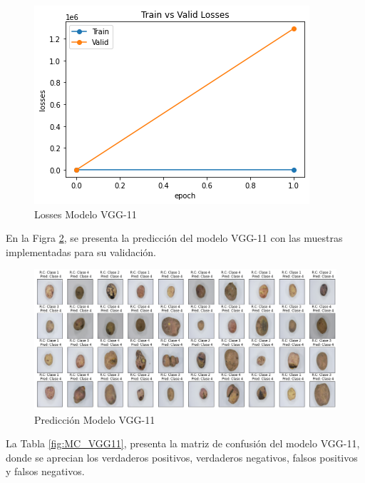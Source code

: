 \begin{figure}[ht]
	\centering
	\includegraphics[scale=0.5]{Figs/106.png}
	\caption{Losses Modelo VGG-11}
	\label{fig:loses_VGG11}
\end{figure}

En la Figra \ref{fig:Pre_VGG11}, se presenta la predicción del modelo VGG-11 con las muestras implementadas para su validación.

\begin{figure}[ht]
	\centering
	\includegraphics[scale=0.4]{Figs/107.png}
	\caption{Predicción Modelo VGG-11}
	\label{fig:Pre_VGG11}
\end{figure}

La Tabla \ref{fig:MC_VGG11}, presenta la matriz de confusión del modelo VGG-11, donde se aprecian los verdaderos positivos, verdaderos negativos, falsos positivos y falsos negativos.

